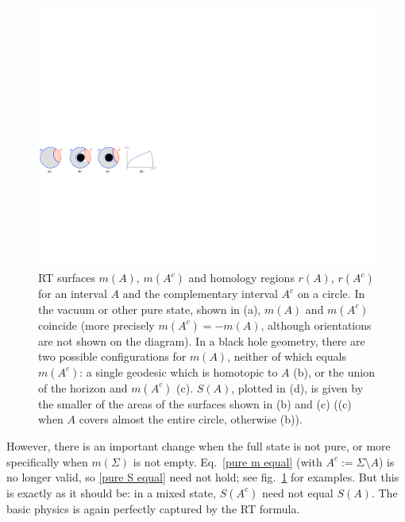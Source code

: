 \documentclass[11pt]{article}
\begin{document}
\begin{figure}[tbp]
\centering
\includegraphics[width=\textwidth]{figs/thermalcircle}
\caption{\label{fig:thermalcircle}
RT surfaces $m(A)$, $m(A^c)$ and homology regions $r(A)$, $r(A^c)$ for an interval $A$ and the complementary interval $A^c$ on a circle. In the vacuum or other pure state, shown in (a), $m(A)$ and $m(A^c)$ coincide (more precisely $m(A^c) = -m(A)$, although orientations are not shown on the diagram). In a black hole geometry, there are two possible configurations for $m(A)$, neither of which equals $m(A^c)$: a single geodesic which is homotopic to $A$ (b), or the union of the horizon and $m(A^c)$ (c). $S(A)$, plotted in (d), is given by the smaller of the areas of the surfaces shown in (b) and (c) ((c) when $A$ covers almost the entire circle, otherwise (b)).
}
\end{figure}

However, there is an important change when the full state is not pure, or more specifically when $m(\Sigma)$ is not empty. Eq.\ \eqref{pure m equal} (with $A^c:=\Sigma\setminus A$) is no longer valid, so \eqref{pure S equal} need not hold; see fig.\ \ref{fig:thermalcircle} for examples. But this is exactly as it should be: in a mixed state, $S(A^c)$ need not equal $S(A)$. The basic physics is again perfectly captured by the RT formula.
\end{document}

